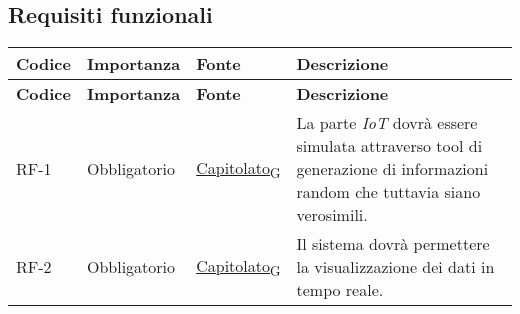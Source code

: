 \subsection{Requisiti funzionali}
\begin{longtable}{|>{\centering\arraybackslash}m{}|>{\centering\arraybackslash}m{}|>{\centering\arraybackslash}m{}|>{\centering\arraybackslash}m{}|}
	\hline
	\textbf{Codice} & \textbf{Importanza} & \textbf{Fonte}                                                                                                    & \textbf{Descrizione}                                                                                                                                                                                                                                                                                                                                                                                                                                                                                 \\\hline
	\endfirsthead
	\hline
	\textbf{Codice} & \textbf{Importanza} & \textbf{Fonte}                                                                                                    & \textbf{Descrizione}                                                                                                                                                                                                                                                                                                                                                                                                                                                                                 \\\hline
	\endhead
	\hline
	RF-1            & Obbligatorio        & \href{https://7last.github.io/docs/rtb/documentazione-interna/glossario\#capitolato}{Capitolato\textsubscript{G}} & La parte \textit{IoT} dovrà essere simulata attraverso tool di generazione di informazioni random che tuttavia siano verosimili.                                                                                                                                                                                                                                                                                                                                                                     \\\hline
	RF-2            & Obbligatorio        & \href{https://7last.github.io/docs/rtb/documentazione-interna/glossario\#capitolato}{Capitolato\textsubscript{G}} & Il sistema dovrà permettere la visualizzazione dei dati in tempo reale.                                                                                                                                                                                                                                                                                                                                                                                                                              \\\hline

\end{longtable}

